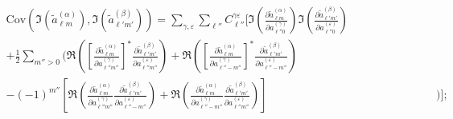 \begin{equation}
\begin{split}
\mathrm{Cov} \left(
\Im \left( \widetilde{a}_{\ell m}^{ \left( \alpha \right) } \right),
\Im \left( \widetilde{a}_{\ell' m'}^{ \left( \beta \right) } \right)
\right) =
\sum_{\gamma, \varepsilon}
\sum_{\ell''}
C_{\ell''}^{\gamma \varepsilon}
\Bigg[
\Im \left(
\frac{\partial \widetilde{a}_{\ell m}^{ \left( \alpha \right) }}
{\partial a_{\ell'' 0}^{ \left( \gamma \right) }}
\right)
\Im \left(
\frac{\partial \widetilde{a}_{\ell' m'}^{ \left( \beta \right) }}
{\partial a_{\ell'' 0}^{ \left( \varepsilon \right) }}
\right)
\qquad\qquad\qquad\quad & \\
+
\frac{1}{2}
\sum_{m'' > 0} \Bigg(
\Re \left(
\left[
\frac{\partial \widetilde{a}_{\ell m}^{ \left( \alpha \right) }}
{\partial a_{\ell'' m''}^{ \left( \gamma \right) }}
\right]^*
\frac{\partial \widetilde{a}_{\ell' m'}^{ \left( \beta \right) }}
{\partial a_{\ell'' m''}^{ \left( \varepsilon \right) }}
\right)
+ \Re \left(
\left[
\frac{\partial \widetilde{a}_{\ell m}^{ \left( \alpha \right) }}
{\partial a_{\ell'' -m''}^{ \left( \gamma \right) }}
\right]^*
\frac{\partial \widetilde{a}_{\ell' m'}^{ \left( \beta \right) }}
{\partial a_{\ell'' -m''}^{ \left( \varepsilon \right) }}
\right) & \\
-
\left( -1 \right)^{m''} \left[
\Re \left(
\frac{\partial \widetilde{a}_{\ell m}^{ \left( \alpha \right) }}
{\partial a_{\ell'' m''}^{ \left( \gamma \right) }}
\frac{\partial \widetilde{a}_{\ell' m'}^{ \left( \beta \right) }}
{\partial a_{\ell'' -m''}^{ \left( \varepsilon \right) }}
\right)
+ \Re \left(
\frac{\partial \widetilde{a}_{\ell m}^{ \left( \alpha \right) }}
{\partial a_{\ell'' -m''}^{ \left( \gamma \right) }}
\frac{\partial \widetilde{a}_{\ell' m'}^{ \left( \beta \right) }}
{\partial a_{\ell'' m''}^{ \left( \varepsilon \right) }}
\right) \right] &
\Bigg) \Bigg];
\label{el_Eqn:cov_im_im_general}
\end{split}
\end{equation}
